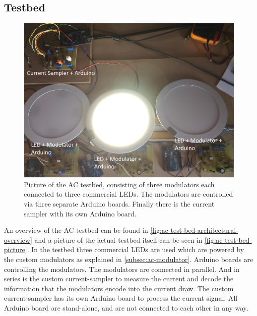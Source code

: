 

\subsection{Testbed}
\label{subsec:ac-testbed}

\begin{figure}[ht]
	\centering
	\includegraphics[angle=0,width=\textwidth,height=.9\textheight,keepaspectratio]{chapters/hardware-chapters/AC/ac-test-bed/ac-test-bed-picture}
	\caption{Picture of the AC testbed, consisting of three modulators each connected to three commercial LEDs. The modulators are controlled via three separate Arduino boards. Finally there is the current sampler with its own Arduino board.}
	\label{fig:ac-test-bed-picture}
\end{figure}



An overview of the AC testbed can be found in \autoref{fig:ac-test-bed-architectural-overview} and a picture of the actual testbed itself can be seen in \autoref{fig:ac-test-bed-picture}.
In the testbed three commercial LEDs are used which are powered by the custom modulators as explained in \autoref{subsec:ac-modulator}.
Arduino boards are controlling the modulators.
The modulators are connected in parallel. 
And in series is the custom current-sampler to measure the current and decode the information that the modulators encode into the current draw.
The custom current-sampler has its own Arduino board to process the current signal.
All Arduino board are stand-alone, and are not connected to each other in any way.


